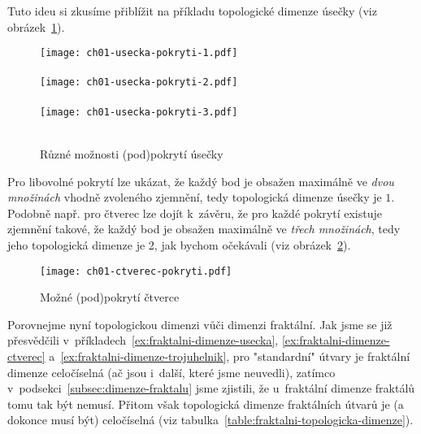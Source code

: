 Tuto ideu si zkusíme přiblížit na příkladu topologické dimenze úsečky (viz obrázek~\ref{fig:usecka-zjemneni}).
\begin{figure}[h]
    \centering
    \texttt{[image: ch01-usecka-pokryti-1.pdf]}\\\qquad\\
    \texttt{[image: ch01-usecka-pokryti-2.pdf]}\\\qquad\\
    \texttt{[image: ch01-usecka-pokryti-3.pdf]}\\\qquad\\
    \caption{Různé možnosti (pod)pokrytí úsečky}
    \label{fig:usecka-zjemneni}
\end{figure}
Pro libovolné pokrytí lze ukázat, že každý bod je obsažen maximálně ve \emph{dvou množinách} vhodně zvoleného zjemnění, tedy topologická dimenze úsečky je $1$. Podobně např. pro čtverec lze dojít k~závěru, že pro každé pokrytí existuje zjemnění takové, že každý bod je obsažen maximálně ve \emph{třech množinách}, tedy jeho topologická dimenze je 2, jak bychom očekávali (viz obrázek~\ref{fig:ctverec-zjemneni}).
\begin{figure}[h]
    \centering
    \texttt{[image: ch01-ctverec-pokryti.pdf]}
    \caption{Možné (pod)pokrytí čtverce}
    \label{fig:ctverec-zjemneni}
\end{figure}
Porovnejme nyní topologickou dimenzi vůči dimenzi fraktální. Jak jsme se již přesvědčili v~příkladech~\ref{ex:fraktalni-dimenze-usecka}, \ref{ex:fraktalni-dimenze-ctverec} a~\ref{ex:fraktalni-dimenze-trojuhelnik}, pro "standardní" útvary je fraktální dimenze celočíselná (ač jsou i~další, které jsme neuvedli), zatímco v~podsekci~\ref{subsec:dimenze-fraktalu} jsme zjistili, že u~fraktální dimenze fraktálů tomu tak být nemusí. Přitom však topologická dimenze fraktálních útvarů je (a dokonce musí být) celočíselná (viz tabulka~\ref{table:fraktalni-topologicka-dimenze}).
